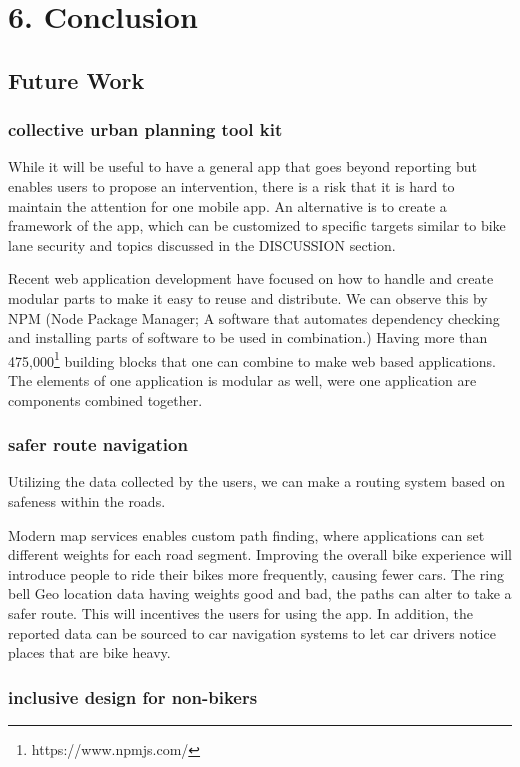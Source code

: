 \chapter{6. Conclusion}

\section{Future Work}

\subsection{collective urban planning tool kit}

While it will be useful to have a general app that goes beyond reporting
but enables users to propose an intervention, there is a risk that it is
hard to maintain the attention for one mobile app. An alternative is to
create a framework of the app, which can be customized to specific targets
similar to bike lane security and topics discussed in the DISCUSSION
section.

Recent web application development have focused on how to handle and create modular parts
to make it easy to reuse and distribute. We can observe this by NPM (Node
    Package Manager; A software that automates dependency checking and
    installing parts of software to be used in combination.) Having more than
475,000\footnote{https://www.npmjs.com/} building blocks that one can
combine to make web based applications. The elements of one application is
modular as well, were one application are components combined together.


\subsection{safer route navigation}
Utilizing the data collected by the users, we can make a routing system based on safeness within the roads.

Modern map services enables custom path finding, where applications can set
different weights for each road segment. Improving the overall bike
experience will introduce people to ride their bikes more frequently,
causing fewer cars.
The ring bell Geo location data having weights good and bad, the paths can alter to take a safer route. This will incentives the users for using the app.
In addition, the reported data can be sourced to car navigation systems to let car drivers notice places that are bike heavy.

\subsection{inclusive design for non-bikers}

